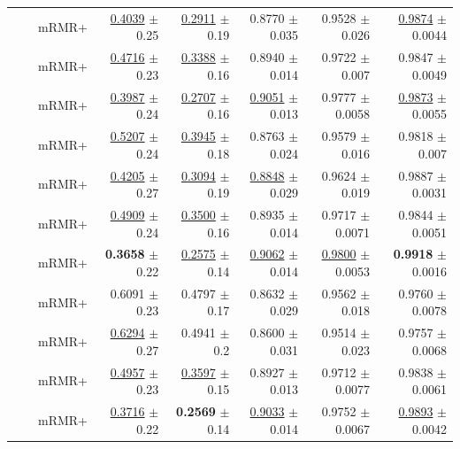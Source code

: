 \begin{longtable}{llp{}rrrrr}
 &  & mRMR+ & \underline{0.4039} {\scriptsize $\pm$ 0.25} & \underline{0.2911} {\scriptsize $\pm$ 0.19} & 0.8770 {\scriptsize $\pm$ 0.035} & 0.9528 {\scriptsize $\pm$ 0.026} & \underline{0.9874} {\scriptsize $\pm$ 0.0044} \\
 &  & mRMR+ & \underline{0.4716} {\scriptsize $\pm$ 0.23} & \underline{0.3388} {\scriptsize $\pm$ 0.16} & 0.8940 {\scriptsize $\pm$ 0.014} & 0.9722 {\scriptsize $\pm$ 0.007} & 0.9847 {\scriptsize $\pm$ 0.0049} \\
 &  & mRMR+ & \underline{0.3987} {\scriptsize $\pm$ 0.24} & \underline{0.2707} {\scriptsize $\pm$ 0.16} & \underline{0.9051} {\scriptsize $\pm$ 0.013} & 0.9777 {\scriptsize $\pm$ 0.0058} & \underline{0.9873} {\scriptsize $\pm$ 0.0055} \\
 &  & mRMR+ & \underline{0.5207} {\scriptsize $\pm$ 0.24} & \underline{0.3945} {\scriptsize $\pm$ 0.18} & 0.8763 {\scriptsize $\pm$ 0.024} & 0.9579 {\scriptsize $\pm$ 0.016} & 0.9818 {\scriptsize $\pm$ 0.007} \\
 &  & mRMR+ & \underline{0.4205} {\scriptsize $\pm$ 0.27} & \underline{0.3094} {\scriptsize $\pm$ 0.19} & \underline{0.8848} {\scriptsize $\pm$ 0.029} & 0.9624 {\scriptsize $\pm$ 0.019} & 0.9887 {\scriptsize $\pm$ 0.0031} \\
 &  & mRMR+ & \underline{0.4909} {\scriptsize $\pm$ 0.24} & \underline{0.3500} {\scriptsize $\pm$ 0.16} & 0.8935 {\scriptsize $\pm$ 0.014} & 0.9717 {\scriptsize $\pm$ 0.0071} & 0.9844 {\scriptsize $\pm$ 0.0051} \\
 &  & mRMR+ & \textbf{0.3658} {\scriptsize $\pm$ 0.22} & \underline{0.2575} {\scriptsize $\pm$ 0.14} & \underline{0.9062} {\scriptsize $\pm$ 0.014} & \underline{0.9800} {\scriptsize $\pm$ 0.0053} & \textbf{0.9918} {\scriptsize $\pm$ 0.0016} \\
 &  & mRMR+ & 0.6091 {\scriptsize $\pm$ 0.23} & 0.4797 {\scriptsize $\pm$ 0.17} & 0.8632 {\scriptsize $\pm$ 0.029} & 0.9562 {\scriptsize $\pm$ 0.018} & 0.9760 {\scriptsize $\pm$ 0.0078} \\
 &  & mRMR+ & \underline{0.6294} {\scriptsize $\pm$ 0.27} & 0.4941 {\scriptsize $\pm$ 0.2} & 0.8600 {\scriptsize $\pm$ 0.031} & 0.9514 {\scriptsize $\pm$ 0.023} & 0.9757 {\scriptsize $\pm$ 0.0068} \\
 &  & mRMR+ & \underline{0.4957} {\scriptsize $\pm$ 0.23} & \underline{0.3597} {\scriptsize $\pm$ 0.15} & 0.8927 {\scriptsize $\pm$ 0.013} & 0.9712 {\scriptsize $\pm$ 0.0077} & 0.9838 {\scriptsize $\pm$ 0.0061} \\
 &  & mRMR+ & \underline{0.3716} {\scriptsize $\pm$ 0.22} & \textbf{0.2569} {\scriptsize $\pm$ 0.14} & \underline{0.9033} {\scriptsize $\pm$ 0.014} & 0.9752 {\scriptsize $\pm$ 0.0067} & \underline{0.9893} {\scriptsize $\pm$ 0.0042} \\

\end{longtable}
